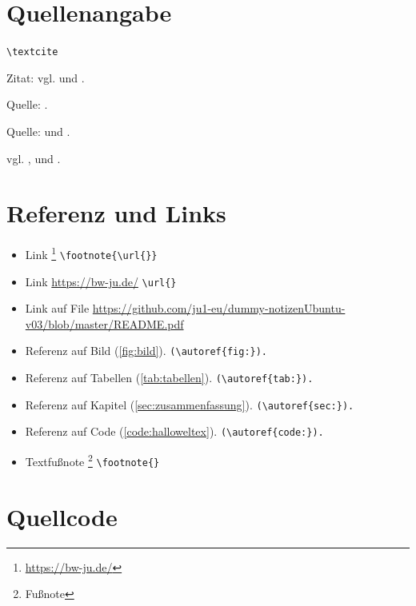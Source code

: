 
\section{Quellenangabe}\label{sec:quellenangabe}

\verb|\textcite|

Zitat: vgl. \textcite{monk:2016:action} und \textcite{kofler:2017:linux}.

Quelle: \textcite{kofler:2018:hacking}.

Quelle: \textcite[87]{schmidt:2015:klima} und \textcite{schneehage:2018:aktoren}.

vgl. \textcite{zeller:2017:hindernis}, \textcite{marquardt:2018:trainingsplan10km} und \textcite{lauren:2017:fit}.


\section{Referenz und Links}\label{sec:referenzlinks}

\begin{itemize}
	\item Link \footnote{\url{https://bw-ju.de/}} \verb|\footnote{\url{}}|
	\item Link \url{https://bw-ju.de/} \verb|\url{}|
	\item Link auf File \url{https://github.com/ju1-eu/dummy-notizenUbuntu-v03/blob/master/README.pdf}
	\item Referenz auf Bild (\autoref{fig:bild}). \verb|(\autoref{fig:}).|
	\item Referenz auf Tabellen (\autoref{tab:tabellen}). \verb|(\autoref{tab:}).|
	\item Referenz auf Kapitel (\autoref{sec:zusammenfassung}). \verb|(\autoref{sec:}).|
 	\item Referenz auf Code (\autoref{code:halloweltex}). \verb|(\autoref{code:}).|
	\item Textfußnote \footnote{Fußnote} \verb|\footnote{}|
\end{itemize}


\section{Quellcode}

